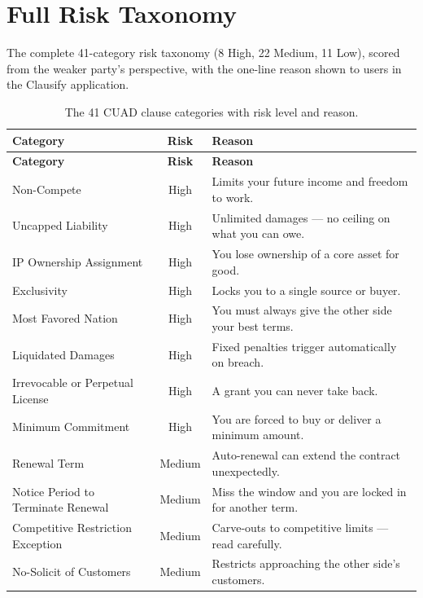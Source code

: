 \chapter{Full Risk Taxonomy}
\label{app:taxonomy}

The complete 41-category risk taxonomy (8 High, 22 Medium, 11 Low), scored from the weaker party's perspective, with the one-line reason shown to users in the Clausify application.

\begin{longtable}{p{4.6cm} c p{7.6cm}}
\caption{The 41 CUAD clause categories with risk level and reason.}\\
\toprule
\textbf{Category} & \textbf{Risk} & \textbf{Reason}\\
\midrule
\endfirsthead
\toprule
\textbf{Category} & \textbf{Risk} & \textbf{Reason}\\
\midrule
\endhead
Non-Compete & \textcolor{riskhigh}{High} & Limits your future income and freedom to work.\\
Uncapped Liability & \textcolor{riskhigh}{High} & Unlimited damages --- no ceiling on what you can owe.\\
IP Ownership Assignment & \textcolor{riskhigh}{High} & You lose ownership of a core asset for good.\\
Exclusivity & \textcolor{riskhigh}{High} & Locks you to a single source or buyer.\\
Most Favored Nation & \textcolor{riskhigh}{High} & You must always give the other side your best terms.\\
Liquidated Damages & \textcolor{riskhigh}{High} & Fixed penalties trigger automatically on breach.\\
Irrevocable or Perpetual License & \textcolor{riskhigh}{High} & A grant you can never take back.\\
Minimum Commitment & \textcolor{riskhigh}{High} & You are forced to buy or deliver a minimum amount.\\
\midrule
Renewal Term & \textcolor{riskmed}{Medium} & Auto-renewal can extend the contract unexpectedly.\\
Notice Period to Terminate Renewal & \textcolor{riskmed}{Medium} & Miss the window and you are locked in for another term.\\
Competitive Restriction Exception & \textcolor{riskmed}{Medium} & Carve-outs to competitive limits --- read carefully.\\
No-Solicit of Customers & \textcolor{riskmed}{Medium} & Restricts approaching the other side's customers.\\

\end{longtable}
